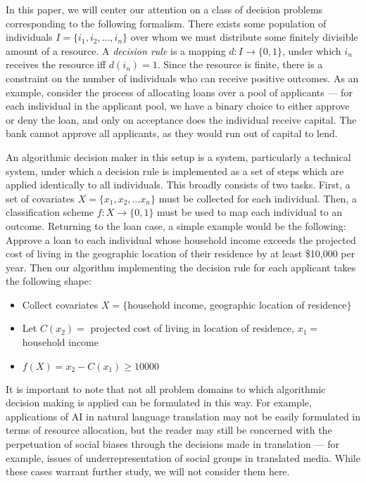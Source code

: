 In this paper, we will center our attention on a class of decision problems
corresponding to the following formalism. There exists some population of 
individuals $I = \{i_1, i_2, \ldots, i_n\}$ over whom we must distribute some
finitely divisible amount of a resource. A \textit{decision rule} is a
mapping $d: I \rightarrow \{0, 1\}$, under which $i_n$ receives the resource iff
$d(i_n) = 1$. Since the resource is finite, there is a constraint on the number
of individuals who can receive positive outcomes. As an example, consider the
process of allocating loans over a pool of applicants — for each individual in
the applicant pool, we have a binary choice to either approve or deny the loan,
and only on acceptance does the individual receive capital. The bank cannot 
approve all applicants, as they would run out of capital to lend.

An algorithmic decision maker in this setup is a system, particularly a
technical system, under which a decision rule is implemented as a set of steps
which are applied identically to all individuals. This broadly consists of two
tasks. First, a set of covariates $X = \{x_1, x_2, \ldots x_n\}$ must be
collected for each individual. Then, a classification scheme
$f: X \rightarrow \{0, 1\}$ must be used to map each individual to an outcome.
Returning to the loan case, a simple example would be the following: Approve a
loan to each individual whose household income exceeds the projected cost of
living in the geographic location of their residence by at least \$10,000 per
year. Then our algorithm implementing the decision rule for each applicant takes
the following shape:
\begin{itemize}
    \item Collect covariates $X=\{$household income, geographic location of residence$\}$
    \item Let $C(x_2) =$ projected cost of living in location of residence, $x_1 =$
          household income
    \item $f(X) = x_2 - C(x_1) \geq 10000$
\end{itemize}

It is important to note that not all problem domains to which algorithmic
decision making is applied can be formulated in this way. For example,
applications of AI in natural language translation may not be easily formulated
in terms of resource allocation, but the reader may still be concerned with the
perpetuation of social biases through the decisions made in translation — for
example, issues of underrepresentation of social groups in translated media.  
While these cases warrant further study, we will not consider them here.

